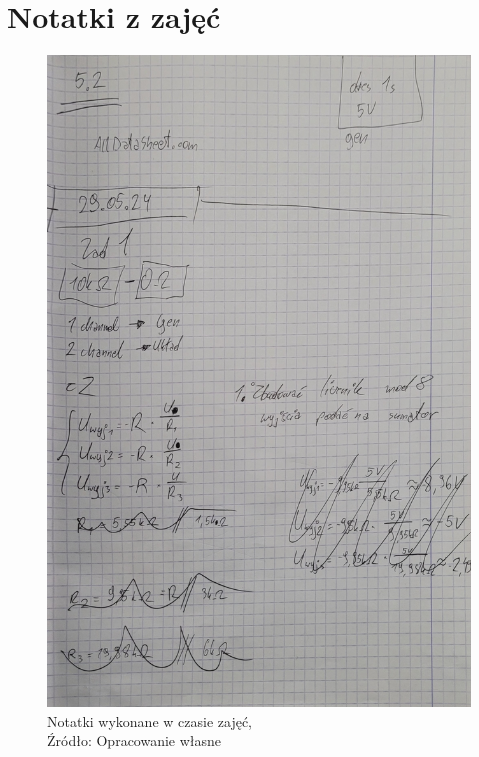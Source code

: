 \documentclass{article}
\begin{document}
  \section{Notatki z zajęć}
  
  \begin{figure}[!ht]
    \begin{minipage}{.5\textwidth}
      \centering
      \includegraphics[scale=0.12]{grafiki/notatki.jpg}
      \caption{Notatki wykonane w czasie zajęć,
      \\Źródło: Opracowanie własne}
    \end{minipage}
    \begin{minipage}{.5\textwidth}
      \centering

\end{minipage}
\end{figure}
\end{document}
